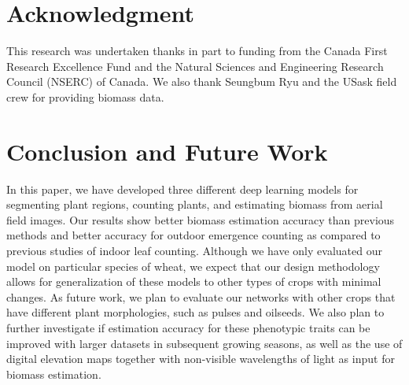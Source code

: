 \documentclass[10pt,twocolumn,letterpaper]{article}
\begin{document}
\section*{Acknowledgment}
This research was undertaken thanks in part to funding from the Canada First Research Excellence Fund and the Natural Sciences and Engineering Research Council (NSERC) of Canada. We also thank Seungbum Ryu and the USask field crew for providing biomass data.


\section{Conclusion and Future Work}
\label{sec:conclusion}
In this paper, we have developed three different deep learning models for segmenting plant regions, counting plants, and estimating biomass from aerial field images. Our results show better biomass estimation accuracy than previous methods and better accuracy for outdoor emergence counting as compared to previous studies of indoor leaf counting. Although we have only evaluated our model on particular species of wheat, we expect that our design methodology allows for generalization of these models to other types of crops with minimal changes. As future work, we plan to evaluate our networks with other crops that have different plant morphologies, such as pulses and oilseeds. We also plan to further investigate if estimation accuracy for these phenotypic traits can be improved with larger datasets in subsequent growing seasons, as well as the use of digital elevation maps together with non-visible wavelengths of light as input for biomass estimation.

{\small


}

\balance

\newpage
\end{document}
